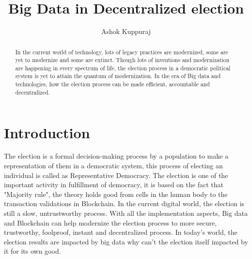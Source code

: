 \documentclass[sigconf]{acmart}
\begin{document}
\title{Big Data in Decentralized election}


\author{Ashok Kuppuraj}


\renewcommand{\shortauthors}{G. v. Laszewski}


\begin{abstract}
In the current world of technology, lots of legacy practices are modernized, some are yet to modernize and some are extinct. Though lots of inventions and modernization are happening in every spectrum of life, the election process in a democratic political system is yet to attain the quantum of modernization. In the era of Big data and technologies, how the election process can be made efficient, accountable and decentralized.
\end{abstract}



\maketitle

\section{Introduction}
The election is a formal decision-making process by a population to make a representation of them in a democratic system, this process of electing an individual is called as Representative Democracy.
The election is one of the important activity in fulfillment of democracy, it is based on the fact that "Majority rule"\cite{1:online}, the theory holds good from cells in the human body to the transaction validations in Blockchain. In the current digital world, the election is still a slow, untrustworthy process. With all the implementation aspects, Big data and Blockchain can help modernize the election process to more secure, trustworthy, foolproof, instant and decentralized process. In today's world, the election results are impacted by big data why can't the election itself impacted by it for its own good.
\end{document}
